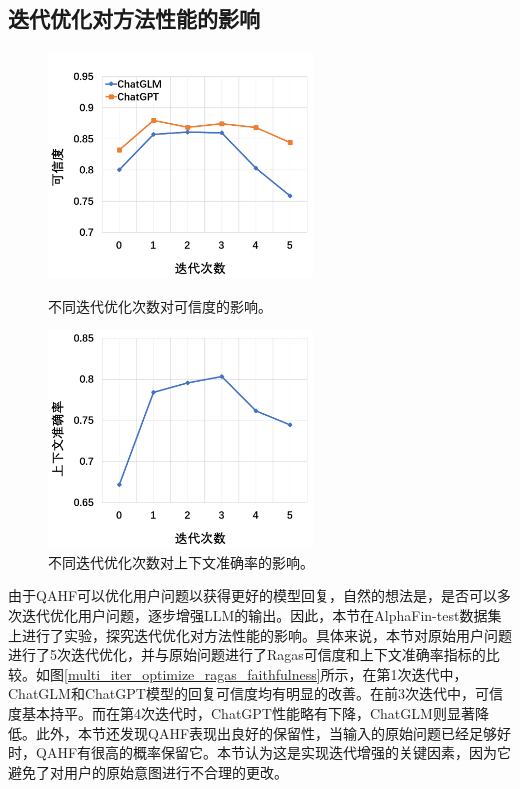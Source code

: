 \subsection{迭代优化对方法性能的影响}

\begin{figure}[htbp]
	\centering
	\begin{minipage}[t]{0.49\textwidth}
		\centering
		\includegraphics[width=7cm]{Fig/multi_iter_optimize_ragas_faithfulness.png}
		\caption{\label{multi_iter_optimize_ragas_faithfulness}不同迭代优化次数对可信度的影响。}
	\end{minipage}
	\begin{minipage}[t]{0.49\textwidth}
		\centering
		\includegraphics[width=7cm]{Fig/multi_iter_optimize_ragas_precision.png}
		\caption{\label{multi_iter_optimize_ragas_precision}不同迭代优化次数对上下文准确率的影响。}
	\end{minipage}
\end{figure}

由于QAHF可以优化用户问题以获得更好的模型回复，自然的想法是，是否可以多次迭代优化用户问题，逐步增强LLM的输出。因此，本节在AlphaFin-test数据集上进行了实验，探究迭代优化对方法性能的影响。具体来说，本节对原始用户问题进行了5次迭代优化，并与原始问题进行了Ragas可信度和上下文准确率指标的比较。如图\ref{multi_iter_optimize_ragas_faithfulness}所示，在第1次迭代中，ChatGLM和ChatGPT模型的回复可信度均有明显的改善。在前3次迭代中，可信度基本持平。而在第4次迭代时，ChatGPT性能略有下降，ChatGLM则显著降低。此外，本节还发现QAHF表现出良好的保留性，当输入的原始问题已经足够好时，QAHF有很高的概率保留它。本节认为这是实现迭代增强的关键因素，因为它避免了对用户的原始意图进行不合理的更改。

